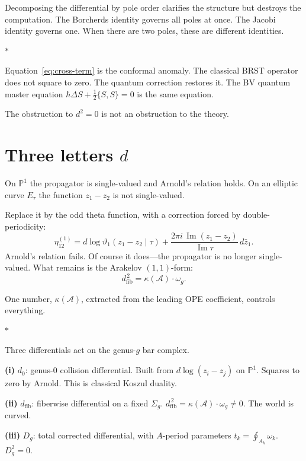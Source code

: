 \documentclass[11pt]{article}
\newcommand{\cA}{\mathcal{A}}
\newcommand{\bP}{\mathbb{P}}
\newcommand{\dzero}{d_0}
\newcommand{\dfib}{d_{\mathrm{fib}}}
\newcommand{\Dg}[1]{D_{#1}}
\newcommand{\sep}{\bigskip\begin{center}$*$\end{center}\medskip}
\begin{document}
Decomposing the differential by pole order clarifies the structure
but destroys the computation.  The Borcherds identity governs all
poles at once.  The Jacobi identity governs one.  When there are
two poles, these are different identities.

\sep

Equation~\eqref{eq:cross-term} is the conformal anomaly.  The
classical BRST operator does not square to zero.  The quantum
correction restores it.  The BV quantum master equation
$\hbar\Delta S + \tfrac{1}{2}\{S,S\} = 0$ is the same equation.

The obstruction to $d^2 = 0$ is not an obstruction to the theory.


\section{Three letters $d$}
\label{sec:three-d}

On $\bP^1$ the propagator is single-valued and Arnold's relation
holds.  On an elliptic curve $E_\tau$ the function $z_1 - z_2$ is
not single-valued.

Replace it by the odd theta function, with a correction forced by
double-periodicity:
\[
\eta^{(1)}_{12} = d\log\vartheta_1(z_1 - z_2 \mid \tau)
  + \frac{2\pi i\,\operatorname{Im}(z_1 - z_2)}
    {\operatorname{Im}\tau}\, d\bar{z}_1.
\]
Arnold's relation fails.  Of course it does---the propagator
is no longer single-valued.  What remains is the Arakelov $(1,1)$-form:
\begin{equation}\label{eq:curvature}
\dfib^{\,2} = \kappa(\cA) \cdot \omega_g.
\end{equation}

One number, $\kappa(\cA)$, extracted from the leading OPE
coefficient, controls everything.

\sep

Three differentials act on the genus-$g$ bar complex.

\medskip
\textbf{(i)} $\dzero$: genus-$0$ collision differential.  Built
from $d\log(z_i - z_j)$ on $\bP^1$.  Squares to zero by Arnold.
This is classical Koszul duality.

\medskip
\textbf{(ii)} $\dfib$: fiberwise differential on a fixed
$\Sigma_g$.  $\dfib^{\,2} = \kappa(\cA) \cdot \omega_g \neq 0$.
The world is curved.

\medskip
\textbf{(iii)} $\Dg{g}$: total corrected differential, with
$A$-period parameters $t_k = \oint_{A_k}\omega_k$.
$\Dg{g}^2 = 0$.
\end{document}
